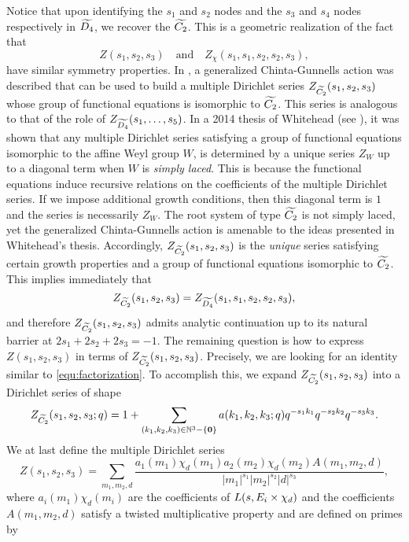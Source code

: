 \documentclass[12pt,reqno,oneside]{amsart}
\begin{document}
Notice that upon identifying the $s_{1}$ and $s_{2}$ nodes and the $s_{3}$ and $s_{4}$ nodes respectively in $\widetilde{D_{4}}$, we recover the $\widetilde{C_{2}}$. This is a geometric realization of the fact that
\[
  Z(s_{1},s_{2},s_{3}) \quad \text{and} \quad Z_{\chi}(s_{1},s_{1},s_{2},s_{2},s_{3}),
\]
have similar symmetry properties. In \cite{DIPP}, a generalized Chinta-Gunnells action was described that can be used to build a multiple Dirichlet series $Z_{\widetilde{C_{2}}}(s_{1},s_{2},s_{3})$ whose group of functional equations is isomorphic to $\widetilde{C_{2}}$. This series is analogous to that of the role of $Z_{\widetilde{D_{4}}}(s_{1},\ldots,s_{5})$. In a 2014 thesis of Whitehead (see \cite{W}), it was shown that any multiple Dirichlet series satisfying a group of functional equations isomorphic to the affine Weyl group $W$, is determined by a unique series $Z_{W}$ up to a diagonal term when $W$ is \textit{simply laced}. This is because the functional equations induce recursive relations on the coefficients of the multiple Dirichlet series. If we impose additional growth conditions, then this diagonal term is $1$ and the series is necessarily $Z_{W}$. The root system of type $\widetilde{C_{2}}$ is not simply laced, yet the generalized Chinta-Gunnells action is amenable to the ideas presented in Whitehead's thesis. Accordingly, $Z_{\widetilde{C_{2}}}(s_{1},s_{2},s_{3})$ is the \textit{unique} series satisfying certain growth properties and a group of functional equations isomorphic to $\widetilde{C_{2}}$. This implies immediately that
\[
  Z_{\widetilde{C_{2}}}(s_{1},s_{2},s_{3}) = Z_{\widetilde{D_{4}}}(s_{1},s_{1},s_{2},s_{2},s_{3}),
\]
and therefore $Z_{\widetilde{C_{2}}}(s_{1},s_{2},s_{3})$ admits analytic continuation up to its natural barrier at $2s_{1}+2s_{2}+2s_{3} = -1$. The remaining question is how to express $Z(s_{1},s_{2},s_{3})$ in terms of $Z_{\widetilde{C_{2}}}(s_{1},s_{2},s_{3})$. Precisely, we are looking for an identity similar to \cref{equ:factorization}. To accomplish this, we expand $Z_{\widetilde{C_{2}}}(s_{1},s_{2},s_{3})$ into a Dirichlet series of shape
\[
  Z_{\widetilde{C_{2}}}(s_{1},s_{2},s_{3};q) = 1+\sum_{(k_{1},k_{2},k_{3}) \in \mathbb{N}^{3}-\{\mathbf{0}\}}a(k_{1},k_{2},k_{3};q)q^{-s_{1}k_{1}}q^{-s_{2}k_{2}}q^{-s_{3}k_{3}}.
\]
We at last define the multiple Dirichlet series
\[
  Z(s_{1},s_{2},s_{3}) = \sum_{m_{1},m_{2},d}\frac{a_{1}(m_{1})\chi_{d}(m_{1})a_{2}(m_{2})\chi_{d}(m_{2})A(m_{1},m_{2},d)}{|m_{1}|^{s_{1}}|m_{2}|^{s_{2}}|d|^{s_{3}}},
\]
where $a_{i}(m_{1})\chi_{d}(m_{i})$ are the coefficients of $L(s,E_{i} \times \chi_{d})$ and the coefficients $A(m_{1},m_{2},d)$ satisfy a twisted multiplicative property and are defined on primes by
\end{document}
